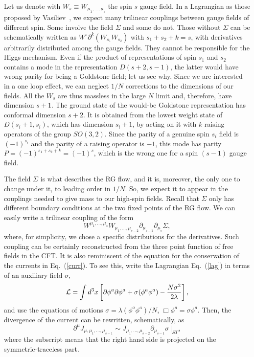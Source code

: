 \documentclass[a4paper,12pt]{article}
\begin{document}
Let us denote with $W_s\equiv W_{\mu_1,...,\mu_s}$ the spin $s$ gauge
field.  In a Lagrangian as those proposed by Vasiliev~\cite{v}, we
expect many trilinear couplings between gauge fields of different
spin. Some involve the field $\Sigma$ and some do not. Those without
$\Sigma$ can be schematically written as $W^s \partial^k
(W_{s_1}W_{s_2})$ with $s_1+s_2+k=s$, with derivatives arbitrarily
distributed among the gauge fields. They cannot be responsible for the
Higgs mechanism. Even if the product of representations of spin $s_1$
and $s_2$ contains a mode in the representation $D(s+2,s-1)$, the
latter would have wrong parity for being a Goldstone field; let us see
why.  Since we are interested in a one loop effect, we can neglect
$1/N$ corrections to the dimensions of our fields.  All the $W_s$ are
thus massless in the large $N$ limit and, therefore, have dimension
$s+1$.  The ground state of the would-be Goldstone representation has
conformal dimension $s+2$. It is obtained from the lowest weight state
of $D(s_i+1,s_i)$, which has dimension $s_i+1$, by acting on it with
$k$ raising operators of the group $SO(3,2)$.  Since the parity of a
genuine spin $s_i$ field is $(-1)^{s_i}$ and the parity of a raising
operator is $-1$, this mode has parity $P=(-1)^{s_1+s_2+k}=(-1)^s$,
which is the wrong one for a spin $(s-1)$ gauge field.

The field $\Sigma$ is what describes the RG flow, and it is, moreover,
the only one to change under it, to leading order in $1/N$. So, we
expect it to appear in the couplings needed to give mass to our
high-spin fields.  Recall that $\Sigma$ only has different boundary
conditions at the two fixed points of the RG flow.  We can easily
write a trilinear coupling of the form
\begin{equation}
W^{\mu_1,...,\mu_s}W_{\mu_1,...,\mu_{s-2}}\partial_{\mu_{s-1}}\partial_{\mu_s}
\Sigma,
\label{trilinear}
\end{equation}
where, for simplicity, we chose a specific distributions for the
derivatives.  Such coupling can be certainly reconstructed from the
three point function of free fields in the CFT. It is also reminiscent
of the equation for the conservation of the currents in
Eq.~(\ref{curr}). To see this, write the Lagrangian Eq.~(\ref{lag}) in
terms of an auxiliary field $\sigma$,
\begin{equation}
{\cal L}=\int d^3x \left[\partial \phi^a \partial \phi^a +\sigma (\phi^a
\phi^a) - {N \sigma^2\over 2\lambda} \right],
\label{lag2}
\end{equation}
and use the equations of motions $\sigma=\lambda (\phi^a\phi^a)/N$,
$\Box \phi^a=\sigma\phi^a$. Then, the divergence of the current can be 
rewritten, schematically, as 
\begin{equation}
\partial^\mu J_{\mu,\mu_1,...,\mu_{s-1}}\sim 
J_{\mu_1,...,\mu_{s-2}}\partial_{\mu_{s-1}}\sigma \, |_{ST},
\label{noncons}
\end{equation}
where the subscript means that the right hand side is projected on
the symmetric-traceless part. 
\end{document}
